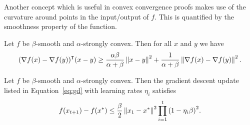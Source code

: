 Another concept which is useful in convex convergence proofs makes use of the
curvature around points in the input/output of $f$. This is quantified by the
smoothness property of the function.


\begin{lemma}
    Let $f$ be $\beta$-smooth and $\alpha$-strongly convex. Then for all $x$ and
    $y$ we have
    \begin{equation}
        {(\nabla f(x) - \nabla f(y))}^\intercal (x - y) \geq
        \frac{\alpha\beta}{\alpha + \beta} \left\| x - y \right\|^2 + \frac{1}{\alpha +
        \beta} \left\| \nabla f(x) - \nabla f(y) \right\|^2.
    \end{equation}
\end{lemma}

\begin{theorem}
    Let $f$ be $\beta$-smooth  and $\alpha$-strongly convex. Then the
    gradient descent update listed in Equation~\ref{eq:gd} with learning rates
    $\eta_i$ satisfies
    \begin{equation}
        f(x_{t+1}) - f(x^*) \leq \frac{\beta}{2} \left\| x_1 - x^* \right\|^2\prod_{i = 1}^t {\left( 1 - \eta_i \beta
        \right)}^{2} .
    \end{equation}
\end{theorem}

